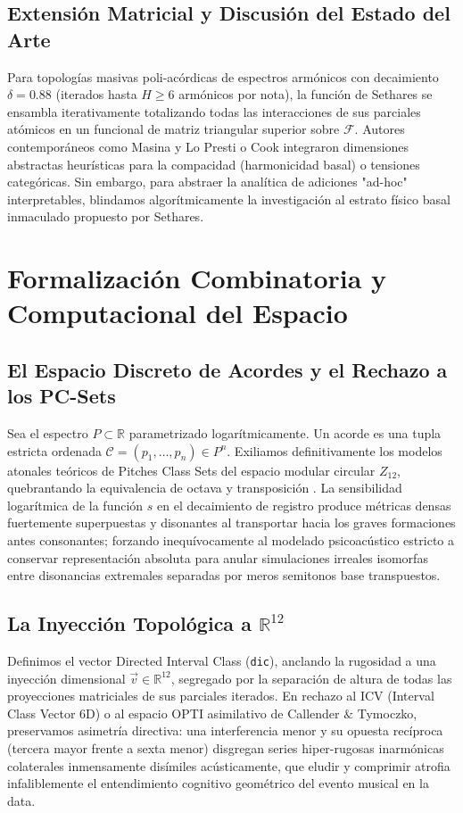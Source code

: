\subsection{Extensión Matricial y Discusión del Estado del Arte}
Para topologías masivas poli-acórdicas de espectros armónicos con decaimiento $\delta = 0.88$ (iterados hasta $H \ge 6$ armónicos por nota), la función de Sethares se ensambla iterativamente totalizando todas las interacciones de sus parciales atómicos en un funcional de matriz triangular superior sobre $\mathcal{F}$. Autores contemporáneos como Masina y Lo Presti o Cook integraron dimensiones abstractas heurísticas para la compacidad (harmonicidad basal) \cite{Masina2024} o tensiones categóricas. Sin embargo, para abstraer la analítica de adiciones "ad-hoc" interpretables, blindamos algorítmicamente la investigación al estrato físico basal inmaculado propuesto por Sethares.

\section{Formalización Combinatoria y Computacional del Espacio}
\label{sec:formalizacion_espacio}

\subsection{El Espacio Discreto de Acordes y el Rechazo a los PC-Sets}
Sea el espectro $P \subset \mathbb{R}$ parametrizado logarítmicamente. Un acorde es una tupla estricta ordenada $\mathcal{C} = (p_1, \dots, p_n) \in P^n$. Exiliamos definitivamente los modelos atonales teóricos de Pitches Class Sets del espacio modular circular $Z_{12}$, quebrantando la equivalencia de octava y transposición \cite{harrison2020}. La sensibilidad logarítmica de la función $s$ en el decaimiento de registro produce métricas densas fuertemente superpuestas y disonantes al transportar hacia los graves formaciones antes consonantes; forzando inequívocamente al modelado psicoacústico estricto a conservar representación absoluta para anular simulaciones irreales isomorfas entre disonancias extremales separadas por meros semitonos base transpuestos.

\subsection{La Inyección Topológica a $\mathbb{R}^{12}$}
Definimos el vector Directed Interval Class (\texttt{dic}), anclando la rugosidad a una inyección dimensional $\vec{v} \in \mathbb{R}^{12}$, segregado por la separación de altura de todas las proyecciones matriciales de sus parciales iterados. En rechazo al ICV (Interval Class Vector 6D) o al espacio OPTI asimilativo de Callender $\&$ Tymoczko, preservamos asimetría directiva: una interferencia menor y su opuesta recíproca (tercera mayor frente a sexta menor) disgregan series hiper-rugosas inarmónicas colaterales inmensamente disímiles acústicamente, que eludir y comprimir atrofia infaliblemente el entendimiento cognitivo geométrico del evento musical en la data.

